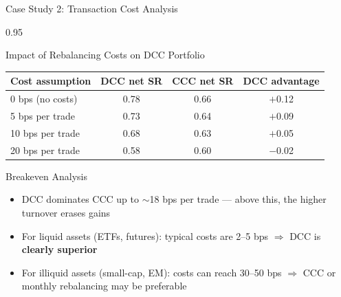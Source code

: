 \documentclass[9pt, aspectratio=169, t]{beamer}
\begin{document}
\begin{frame}{Case Study 2: Transaction Cost Analysis}
    \begin{cminipage}{0.95\textwidth}
    {\footnotesize
    \begin{block}{Impact of Rebalancing Costs on DCC Portfolio}
        \vspace{0.1cm}
        {\small
        \begin{center}
        \begin{tabular}{l|ccc}
            \hline
            \textbf{Cost assumption} & \textbf{DCC net SR} & \textbf{CCC net SR} & \textbf{DCC advantage} \\
            \hline
            0 bps (no costs)    & 0.78 & 0.66 & $+$0.12 \\
            5 bps per trade     & 0.73 & 0.64 & $+$0.09 \\
            10 bps per trade    & 0.68 & 0.63 & $+$0.05 \\
            20 bps per trade    & 0.58 & 0.60 & $-$0.02 \\
            \hline
        \end{tabular}
        \end{center}
        }
    \end{block}
    \begin{alertblock}{Breakeven Analysis}
        \begin{itemize}\setlength{\itemsep}{0pt}
            \item DCC dominates CCC up to $\sim$18 bps per trade --- above this, the higher turnover erases gains
            \item For liquid assets (ETFs, futures): typical costs are 2--5 bps $\Rightarrow$ DCC is \textbf{clearly superior}
            \item For illiquid assets (small-cap, EM): costs can reach 30--50 bps $\Rightarrow$ CCC or monthly rebalancing may be preferable
        \end{itemize}
    \end{alertblock}
    }
    \end{cminipage}
\end{frame}
\end{document}
